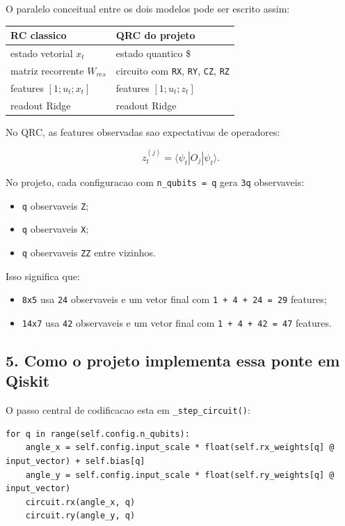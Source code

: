 \documentclass[12pt]{article}
\providecommand{\tightlist}{%
          \setlength{\itemsep}{0pt}\setlength{\parskip}{0pt}}
\begin{document}
O paralelo conceitual entre os dois modelos pode ser escrito assim:

\begin{longtable}[]{@{}ll@{}}
\toprule\noalign{}
RC classico & QRC do projeto \\
\midrule\noalign{}
\endhead
\bottomrule\noalign{}
\endlastfoot
estado vetorial \(x_t\) & estado quantico \$ \\
matriz recorrente \(W_{res}\) & circuito com \texttt{RX}, \texttt{RY}, \texttt{CZ}, \texttt{RZ} \\
features \([1; u_t; x_t]\) & features \([1; u_t; z_t]\) \\
readout Ridge & readout Ridge \\
\end{longtable}

No QRC, as features observadas sao expectativas de operadores:

\[
z_t^{(j)} = \langle \psi_t | O_j | \psi_t \rangle.
\]

No projeto, cada configuracao com \texttt{n\_qubits\ =\ q} gera \texttt{3q} observaveis:

\begin{itemize}
\tightlist
\item
  \texttt{q} observaveis \texttt{Z};
\item
  \texttt{q} observaveis \texttt{X};
\item
  \texttt{q} observaveis \texttt{ZZ} entre vizinhos.
\end{itemize}

Isso significa que:

\begin{itemize}
\tightlist
\item
  \texttt{8x5} usa \texttt{24} observaveis e um vetor final com \texttt{1\ +\ 4\ +\ 24\ =\ 29} features;
\item
  \texttt{14x7} usa \texttt{42} observaveis e um vetor final com \texttt{1\ +\ 4\ +\ 42\ =\ 47} features.
\end{itemize}

\subsection{5. Como o projeto implementa essa ponte em Qiskit}\label{5-como-o-projeto-implementa-essa-ponte-em-qiskit}

O passo central de codificacao esta em \texttt{\_step\_circuit()}:

\begin{verbatim}
for q in range(self.config.n_qubits):
    angle_x = self.config.input_scale * float(self.rx_weights[q] @ input_vector) + self.bias[q]
    angle_y = self.config.input_scale * float(self.ry_weights[q] @ input_vector)
    circuit.rx(angle_x, q)
    circuit.ry(angle_y, q)
\end{verbatim}
\end{document}

